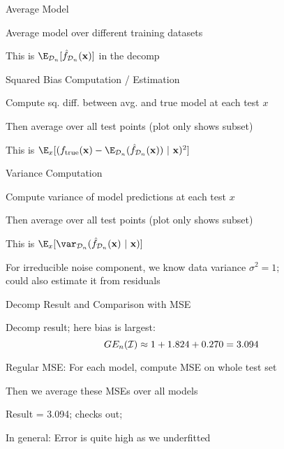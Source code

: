 \documentclass[11pt,compress,t,notes=noshow, xcolor=table]{beamer}
\begin{document}
\begin{framei}[sep=L]{Average Model}

\item Average model over different training datasets
\item This is $\E_{\D_n}[\fh_{\D_n}(\xv)]$ in the decomp

\hfill


\end{framei} 


\begin{framei}[sep=M]{Squared Bias Computation / Estimation}

\item Compute sq. diff. between avg. and true model at each test $x$
\item Then average over all test points (plot only shows subset)
\item This is 
$ 
\E_x[ ( \ftrue(\xv)-\E_{\D_n} (\fh_{\D_n}(\xv) )~|~\xv)^2]
$




\end{framei} 


\begin{framei}[sep=M]{Variance Computation}

\item Compute variance of model predictions at each test $x$
\item Then average over all test points (plot only shows subset)
\item This is 
$
\E_{x} [\var_{\D_n} (\fh_{\D_n}(\xv) ~|~\xv ) ]
$


\item For irreducible noise component, we know data variance $\sigma^2=1$;\\
could also estimate it from residuals

\end{framei} 


\begin{framei}[fs=small,sep=M]{Decomp Result and Comparison with MSE}

\item Decomp result; here bias is largest:
$$GE_n(\mathcal{I}) \approx 1 + 1.824 + 0.270 = 3.094 $$


\item Regular MSE: For each model, compute MSE on whole test set
\item Then we average these MSEs over all models
\item Result = 3.094; checks out; \\
\item In general: Error is quite high as we underfitted

\end{framei}
\end{document}
